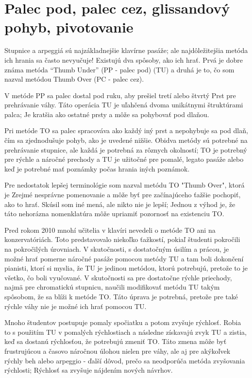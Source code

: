 \documentclass[11pt,a4paper]{book}
\begin{document}
\section{Palec pod, palec cez, glissandový pohyb, pivotovanie}\label{s:thumb-under}
Stupnice a arpeggiá sú najzákladnejšie klavírne pasáže; ale najdôležitejšia metóda ich hrania sa často nevyučuje! Existujú dva spôsoby, ako ich hrať. Prvá je dobre známa metóda “Thumb Under” (PP - palec pod) (TU) a druhá je to, čo som nazval metódou Thumb Over (PC - palec cez).

V metóde PP sa palec dostal pod ruku, aby prešiel tretí alebo štvrtý
Prst pre prehrávanie váhy. Táto operácia TU je uľahčená dvoma unikátnymi štruktúrami palca; Je kratšia ako ostatné prsty a môže sa pohybovať pod dlaňou.

Pri metóde TO sa palec spracováva ako každý iný prst a nepohybuje sa pod dlaň, čím sa zjednodušuje pohyb, ako je uvedené nižšie. Obidva metódy sú potrebné na prehrávanie stupnice, ale každá je potrebná za rôznych okolností; TO je potrebný pre rýchle a náročné prechody a TU je užitočné pre pomalé, legato pasáže alebo keď je potrebné mať poznámky počas hrania iných poznámok.

Pre nedostatok lepšej terminológie som nazval metódu TO "Thumb Over", ktorá je
Zrejmé nesprávne pomenovanie a môže byť pre začínajúceho ťažšie pochopiť, ako to hrať. Skúsil som iné mená, ale nikto nie je lepší; Jednou z výhod je, že táto nehorázna nomenklatúra môže upriamiť pozornosť na existenciu TO.

Pred rokom 2010 mnohí učitelia v klavíri nevedeli o metóde TO ani na konzervatóriách. Toto predstavovalo niekoľko ťažkostí, pokiaľ študenti pokročili na pokročilých úrovniach. V skutočnosti, s dostatočným úsilím a prácou, je možné hrať pomerne náročné pasáže pomocou metódy TU a tam boli dokončení pianisti, ktorí si myslia, že TU je jedinou metódou, ktorú potrebujú, pretože to je všetko, čo boli vyučované. V skutočnosti sa pre dostatočne rýchle priechody, najmä pre chromatickú stupnicu, naučili modifikovať metódu TU takým spôsobom, že sa blíži k metóde TO. Táto úprava je potrebná, pretože pre také rýchle váhy nie je možné ich hrať pomocou TU.

Mnoho študentov postupuje pomaly spočiatku a potom zvyšuje rýchlosť. Robia to s použitím TU v pomalých rýchlostiach a následne získavajú zvyk TU a zistia, keď sa dostanú rýchlosťou, že potrebujú zmeniť TO. Táto zmena môže byť frustrujúcou a časovo náročnou úlohou nielen pre váhy, ale aj pre akýkoľvek rýchly beh alebo arpeggio - ďalší dôvod, prečo sa neodporúča metóda zvyšovania rýchlosti; Rýchlosť sa zvyšuje nájdením nových návrhov.
\end{document}
